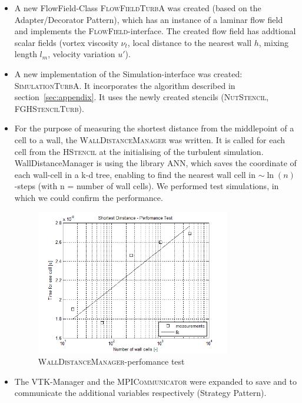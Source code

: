 \documentclass[11pt,a4paper]{article}
\begin{document}
\begin{itemize}
\item A new FlowField-Class \textsc{FlowFieldTurbA} was created (based on the Adapter/Decorator Pattern), which has an instance of a laminar flow field and implements the \textsc{FlowField}-interface. The created flow field has addtional scalar fields (vortex viscosity $\nu_t$, local distance to the nearest wall $h$, mixing length $l_m$, velocity variation $u'$).
\item A new implementation of the Simulation-interface was created: \textsc{SimulationTurbA}. It incorporates the algorithm described in section~\ref{sec:appendix}. It uses the newly created stencils (\textsc{NutStencil}, \textsc{FGHStencilTurb}).
\item For the purpose of measuring the shortest distance from the middlepoint of a cell to a wall, the \textsc{WallDistanceManager} was written. It is called for each cell from the \textsc{HStencil} at the initialising of the turbulent simulation. WallDistanceManager is using the library ANN, which saves the coordinate of each wall-cell in a k-d tree, enabling to find the nearest wall cell in $\sim\ln(n)$-steps (with n = number of wall cells). We performed test simulations, in which we could confirm the performance.

\begin{figure}[h]
    \centering
    \includegraphics[width=0.8\textwidth]{ann}
    \caption{\textsc{WallDistanceManager}-perfomance test}
    \label{fig:vels}
\end{figure}

\item The VTK-Manager and the \textsc{MPICommunicator} were expanded to save and to communicate the additional variables respectively (Strategy Pattern).
\end{itemize}
\end{document}
